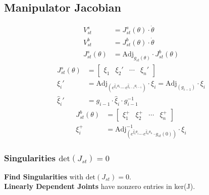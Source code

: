 \subsection{Manipulator Jacobian}
    \vspace{-1em}
    \begin{align*}
        V_{st}^s &= J_{st}^s(\theta) \cdot \dot{\theta}\\
        V_{st}^b &= J_{st}^b(\theta) \cdot \dot{\theta}\\[1em]
        J_{st}^s(\theta) &= \textrm{Adj}_{g_{st}(\theta)} \cdot  J_{st}^b(\theta)
    \end{align*}
    \vspace{-0.5em}
        \begin{align*}
            J_{st}^s(\theta) &=
                \begin{bmatrix}
                    \xi_1 & \xi_2' & \cdots & \xi_n'
                \end{bmatrix}
            \\[0.5em]
            \xi_i' &= \textrm{Adj}_{\left(e^{\widehat{\xi}_1\theta_1} \cdots\, e^{\widehat{\xi}_{i-1}\theta_{i-1}}\right)} \cdot \xi_i = \textrm{Adj}_{(g_{i-1})} \cdot \xi_i\\
            \widehat{\xi}_i' &= g_{i-1} \cdot \widehat{\xi}_i \cdot g_{i-1}^{-1}
        \end{align*}
        \begin{align*}
            J_{st}^b(\theta) &=
                \begin{bmatrix}
                    \xi_1^+ & \xi_2^+ & \cdots & \xi_n^+
                \end{bmatrix}
            \\[0.5em]
            \xi_i^+ &= \textrm{Adj}^{-1}_{\left(e^{\widehat{\xi}_i \theta_i} \cdots\, e^{\widehat{\xi}_{n}\theta_{n}} \cdot g_{st}(0)\right)} \cdot \xi_i
        \end{align*}
        \vfill \null \columnbreak
    \subsubsection{Singularities \texorpdfstring{\hfill $\textrm{det}(J_{st}) = 0$}{\textit{Jacobian is not invertible}}}
        \textbf{Find Singularities} with $\textrm{det}(J_{st}) = 0$.\\[0.5em]
        \vspace{0.5em}
        \textbf{Linearly Dependent Joints} have nonzero entries in ker(J).\\[0.5em]
        \vspace{0.25em}

